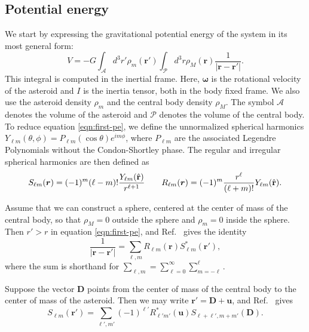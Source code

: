\documentclass[11pt]{article}
\begin{document}
\subsection{Potential energy}
We start by expressing the gravitational potential energy of the system in its most general form:
\begin{equation}
V = -G\int_\mathcal{A} d^3 r' \rho_m(\bm r')\int_\mathcal{P} d^3 r \rho_M(\bm r) \frac{1}{|\bm{r}-\bm{r'}|}.
\label{eqn:first-pe}
\end{equation}
This integral is computed in the inertial frame. Here, $\bm{\omega}$ is the rotational velocity of the asteroid and $I$ is the inertia tensor, both in the body fixed frame. We also use the asteroid density $\rho_m$ and the central body density $\rho_M$. The symbol $\mathcal{A}$ denotes the volume of the asteroid and $\mathcal{P}$ denotes the volume of the central body. To reduce equation \ref{eqn:first-pe}, we define the unnormalized spherical harmonics $Y_{\ell m}(\theta, \phi) = P_{\ell m}(\cos \theta)e^{im\phi}$, where $P_{\ell m}$ are the associated Legendre Polynomials without the Condon-Shortley phase. The regular and irregular spherical harmonics are then defined as
\begin{equation}
S_{\ell m}(\bm r) = (-1)^m (\ell - m)! \frac{Y_{\ell m}(\hat{\mathbf{r}})}{r^{\ell+1}} \qquad R_{\ell m} (\bm r) = (-1)^m \frac{r^\ell}{(\ell + m)!} Y_{\ell m}(\hat{\mathbf{r}}).
\end{equation}

Assume that we can construct a sphere, centered at the center of mass of the central body, so that $\rho_M = 0$ outside the sphere and $\rho_m = 0$ inside the sphere. Then $r' > r$ in equation \ref{eqn:first-pe}, and Ref.~\cite{Gelderen1998TheSO} gives the identity
\begin{equation}
\frac{1}{|\bm r - \bm r'|} = \sum_{\ell, m} R_{\ell m}(\bm r) S_{\ell m}^*(\bm r'),
\label{eqn:1-over-r-expansion}
\end{equation}
where the sum is shorthand for $\sum_{\ell, m} = \sum_{\ell = 0}^\infty \sum_{m=-\ell}^\ell$.

Suppose the vector $\bm{D}$ points from the center of mass of the central body to the center of mass of the asteroid. Then we may write $ \bm r' = \bm D + \bm u$, and Ref.~\cite{Gelderen1998TheSO} gives
\begin{equation}
S_{\ell m}(\bm r') = \sum_{\ell', m'} (-1)^{\ell'}R^*_{\ell' m'}(\bm u)S_{\ell+\ell', m + m'} (\bm D).
\end{equation}
\end{document}
